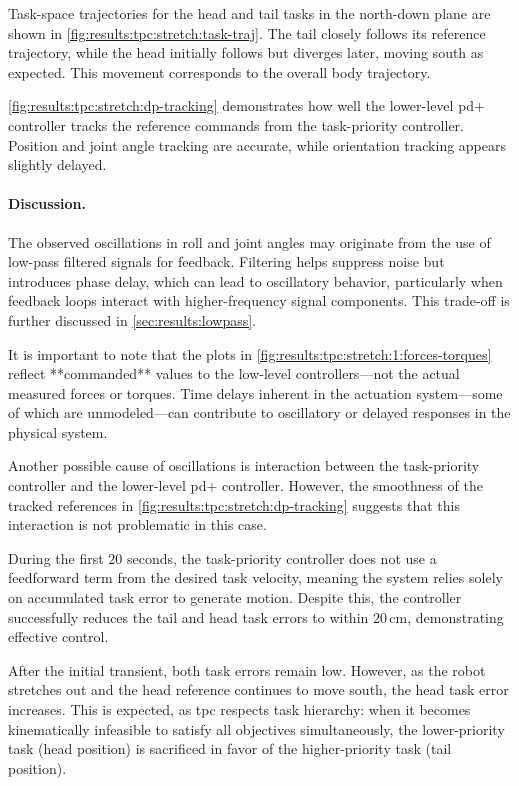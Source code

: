 Task-space trajectories for the head and tail tasks in the north-down plane are shown in \autoref{fig:results:tpc:stretch:task-traj}. The tail closely follows its reference trajectory, while the head initially follows but diverges later, moving south as expected. This movement corresponds to the overall body trajectory.

\autoref{fig:results:tpc:stretch:dp-tracking} demonstrates how well the lower-level \gls{pd+} controller tracks the reference commands from the task-priority controller. Position and joint angle tracking are accurate, while orientation tracking appears slightly delayed.

\paragraph{Discussion.}

The observed oscillations in roll and joint angles may originate from the use of low-pass filtered signals for feedback. Filtering helps suppress noise but introduces phase delay, which can lead to oscillatory behavior, particularly when feedback loops interact with higher-frequency signal components. This trade-off is further discussed in \autoref{sec:results:lowpass}.

It is important to note that the plots in \autoref{fig:results:tpc:stretch:1:forces-torques} reflect **commanded** values to the low-level controllers—not the actual measured forces or torques. Time delays inherent in the actuation system—some of which are unmodeled—can contribute to oscillatory or delayed responses in the physical system.

Another possible cause of oscillations is interaction between the task-priority controller and the lower-level \gls{pd+} controller. However, the smoothness of the tracked references in \autoref{fig:results:tpc:stretch:dp-tracking} suggests that this interaction is not problematic in this case.

During the first \(20\) seconds, the task-priority controller does not use a feedforward term from the desired task velocity, meaning the system relies solely on accumulated task error to generate motion. Despite this, the controller successfully reduces the tail and head task errors to within \(20\,\mathrm{cm}\), demonstrating effective control.

After the initial transient, both task errors remain low. However, as the robot stretches out and the head reference continues to move south, the head task error increases. This is expected, as \gls{tpc} respects task hierarchy: when it becomes kinematically infeasible to satisfy all objectives simultaneously, the lower-priority task (head position) is sacrificed in favor of the higher-priority task (tail position).

